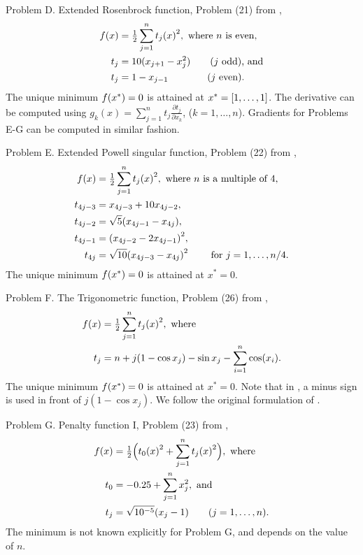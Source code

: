 \documentclass[main.tex]{subfiles}
\begin{document}
Problem D. Extended Rosenbrock function, Problem (21) from
\citet{more1981testing},
\begin{align}
  \begin{split}
    f(x)&={\textstyle\frac{1}{2}}\sum_{j=1}^n {t_j(x)}^2,\text{ where $n$ is even,}\\
    t_j&=10(x_{j+1}-x_j^2)\qquad\text{($j$ odd), and}\\
    t_j&=1-x_{j-1}\qquad\qquad\text{($j$ even).}
  \end{split}
\end{align}
The unique minimum $f(x^*)=0$ is attained at
$x^*=\left[1,\dots,1\right]$.  The derivative can be computed using
$g_k(x)=\sum_{j=1}^n t_j \frac{\partial t_j}{\partial x_k}$,
($k=1,\dots,n$).  Gradients for Problems E-G can be computed in
similar fashion.

Problem E. Extended Powell singular function, Problem (22) from
\citet{more1981testing},
\begin{align}
  \begin{split}
    f(x)&={\textstyle\frac{1}{2}}\sum_{j=1}^n {t_j(x)}^2,\text{
      where $n$ is a multiple of
      4,}\\
    t_{4j-3} &= x_{4j-3}+10x_{4j-2},\\
    t_{4j-2} &= \sqrt{5}(x_{4j-1}-x_{4j}),\\
    t_{4j-1} &= {(x_{4j-2}-2x_{4j-1})}^2,\\
    t_{4j} &= \sqrt{10}{(x_{4j-3}-x_{4j})}^2 \qquad \text{ for
      $j = 1,\dots,n/4$.}
  \end{split}
\end{align}
The unique minimum $f(x^*)=0$ is attained at $x^*=0$.

Problem F. The Trigonometric function, Problem (26) from
\citet{more1981testing},
\begin{align}
  \begin{split}
    f(x)&={\textstyle\frac{1}{2}}\sum_{j=1}^n {t_j(x)}^2,\text{ where}\\
    t_j &= n + j(1-\cos x_j) - \sin x_j -\sum_{i=1}^n\cos(x_i).
  \end{split}
\end{align}
The unique minimum $f(x^*)=0$ is attained at $x^*=0$.  Note that in
\citet{sterck2013steepest}, a minus sign is used in front of
$j(1-\cos x_j)$. We follow the original formulation of
\citet{more1981testing}.


Problem G. Penalty function I, Problem (23) from
\citet{more1981testing},
\begin{align}
  \begin{split}
    f(x)&={\textstyle\frac{1}{2}}\Bigl( {t_0(x)}^2 +
    \sum_{j=1}^n {t_j(x)}^2\Bigr),\text{ where}\\
    t_0 &= -0.25 + \sum_{j=1}^nx_j^2, \text{ and}\\
    t_j &= \sqrt{10^{-5}}(x_j-1)\qquad (j=1,\dots,n).
  \end{split}
\end{align}
The minimum is not known explicitly for Problem G, and depends on the
value of $n$.
\end{document}
